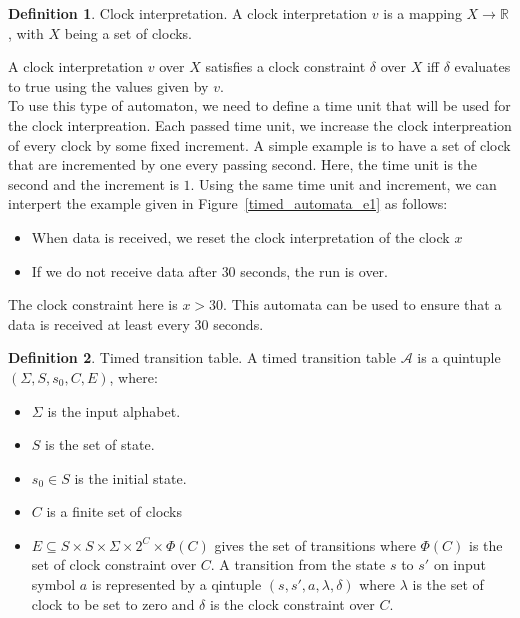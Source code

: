 \documentclass[12pt]{article}
\theoremstyle{definition}
\newtheorem{definition}{Definition}[section]
\theoremstyle{definition}
\theoremstyle{remark}
\newcommand{\R}{\mathbb{R}}
\newcommand{\A}{\mathcal{A}}
\begin{document}
\theoremstyle{definition}
\begin{definition}{Clock interpretation.} A clock interpretation $v$ is a mapping $X \to \R$, with $X$ being a set of clocks.
\end{definition}

A clock interpretation $v$ over $X$ satisfies a clock constraint $\delta$ over $X$ iff $\delta$ evaluates to true using the values given by $v$.\\

To use this type of automaton, we need to define a time unit that will be used for the clock interpreation. Each passed time unit, we increase the clock interpreation of every clock by some fixed increment. A simple example is to have a set of clock that are incremented by one every passing second. Here, the time unit is the second and the increment is $1$. Using the same time unit and increment, we can interpert the example given in Figure~\ref{timed_automata_e1} as follows:
\begin{itemize}
\item When data is received, we reset the clock interpretation of the clock $x$
\item If we do not receive data after $30$ seconds, the run is over.
\end{itemize}

The clock constraint here is $x > 30$. This automata can be used to ensure that a data is received at least every 30 seconds.

\theoremstyle{definition}
\begin{definition}{Timed transition table.} A timed transition table $\A$ is a quintuple $(\Sigma, S, s_{0},C, E)$, where:
\begin{itemize}
\item $\Sigma$ is the input alphabet.
\item $S$ is the set of state.
\item $s_{0} \in S$ is the initial state.
\item $C$ is a finite set of clocks
\item $E \subseteq S \times S \times \Sigma \times 2^{C} \times \Phi(C)$ gives the set of transitions where $\Phi(C)$ is the set of clock constraint over $C$. A transition from the state $s$ to $s'$ on input symbol $a$ is represented by a qintuple $(s, s', a, \lambda, \delta)$ where $\lambda$ is the set of clock to be set to zero and $\delta$ is the clock constraint over $C$.
\end{itemize}
\end{definition}
\end{document}
